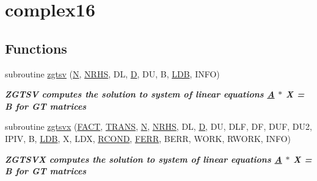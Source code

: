 \hypertarget{group__complex16GTsolve}{}\section{complex16}
\label{group__complex16GTsolve}
\subsection*{Functions}
\begin{DoxyCompactItemize}
\item 
subroutine \hyperlink{group__complex16GTsolve_gafa718af2b9ce6eca26d8dd1cbfc3cedf}{zgtsv} (\hyperlink{polmisc_8c_a0240ac851181b84ac374872dc5434ee4}{N}, \hyperlink{example__user_8c_aa0138da002ce2a90360df2f521eb3198}{N\+R\+H\+S}, D\+L, \hyperlink{odrpack_8h_a7dae6ea403d00f3687f24a874e67d139}{D}, D\+U, B, \hyperlink{example__user_8c_a50e90a7104df172b5a89a06c47fcca04}{L\+D\+B}, I\+N\+F\+O)
\begin{DoxyCompactList}\small\item\em {\bfseries  Z\+G\+T\+S\+V computes the solution to system of linear equations \hyperlink{classA}{A} $\ast$ X = B for G\+T matrices {\bfseries  }}\end{DoxyCompactList}\item 
subroutine \hyperlink{group__complex16GTsolve_ga0f8fa2a56d81bf3db97572afda73b61a}{zgtsvx} (\hyperlink{superlu__enum__consts_8h_af00a42ecad444bbda75cde1b64bd7e72a1b6692b56d378abb85bd49063721d034}{F\+A\+C\+T}, \hyperlink{superlu__enum__consts_8h_a0c4e17b2d5cea33f9991ccc6a6678d62a1f61e3015bfe0f0c2c3fda4c5a0cdf58}{T\+R\+A\+N\+S}, \hyperlink{polmisc_8c_a0240ac851181b84ac374872dc5434ee4}{N}, \hyperlink{example__user_8c_aa0138da002ce2a90360df2f521eb3198}{N\+R\+H\+S}, D\+L, \hyperlink{odrpack_8h_a7dae6ea403d00f3687f24a874e67d139}{D}, D\+U, D\+L\+F, D\+F, D\+U\+F, D\+U2, I\+P\+I\+V, B, \hyperlink{example__user_8c_a50e90a7104df172b5a89a06c47fcca04}{L\+D\+B}, X, L\+D\+X, \hyperlink{superlu__enum__consts_8h_af00a42ecad444bbda75cde1b64bd7e72a9b5c151728d8512307565994c89919d5}{R\+C\+O\+N\+D}, \hyperlink{superlu__enum__consts_8h_af00a42ecad444bbda75cde1b64bd7e72a78fd14d7abebae04095cfbe02928f153}{F\+E\+R\+R}, B\+E\+R\+R, W\+O\+R\+K, R\+W\+O\+R\+K, I\+N\+F\+O)
\begin{DoxyCompactList}\small\item\em {\bfseries  Z\+G\+T\+S\+V\+X computes the solution to system of linear equations \hyperlink{classA}{A} $\ast$ X = B for G\+T matrices {\bfseries  }}\end{DoxyCompactList}\end{DoxyCompactItemize}



